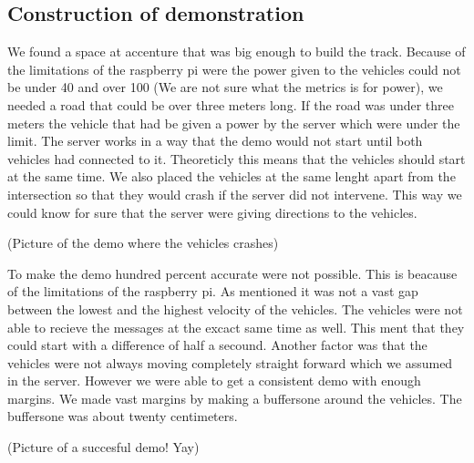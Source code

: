 \subsection{Construction of demonstration}

We found a space at accenture that was big enough to build the track. Because of the limitations of the raspberry pi were the power given to the vehicles could not be under 40 and over 100 (We are not sure what the metrics is for power), we needed a road that could be over three meters long. If the road was under three meters the vehicle that had be given a power by the server which were under the limit. The server works in a way that the demo would not start until both vehicles had connected to it. Theoreticly this means that the vehicles should start at the same time. We also placed the vehicles at the same lenght apart from the intersection so that they would crash if the server did not intervene. This way we could know for sure that the server were giving directions to the vehicles. 

(Picture of the demo where the vehicles crashes)

To make the demo hundred percent accurate were not possible. This is beacause of the limitations of the raspberry pi. As mentioned it was not a vast gap between the lowest and the highest velocity of the vehicles. The vehicles were not able to recieve the messages at the excact same time as well. This ment that they could start with a difference of half a secound. Another factor was that the vehicles were not always moving completely straight forward which we assumed in the server. However we were able to get a consistent demo with enough margins. We made  vast margins by making a buffersone around the vehicles. The buffersone was about twenty centimeters.

(Picture of a succesful demo! Yay)
